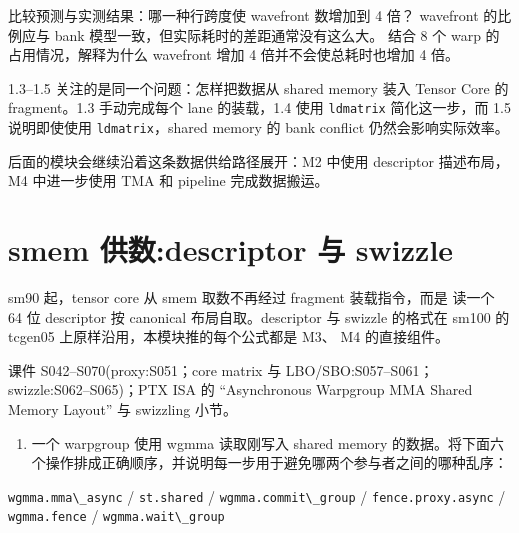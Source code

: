 \documentclass[11pt,a4paper,fontset=none]{ctexart}
\providecommand{\tightlist}{\setlength{\itemsep}{0pt}\setlength{\parskip}{0pt}}
\providecommand{\passthrough}[1]{#1}
\begin{document}
比较预测与实测结果：哪一种行跨度使 wavefront 数增加到 4 倍？ wavefront
的比例应与 bank 模型一致，但实际耗时的差距通常没有这么大。 结合 8 个
warp 的占用情况，解释为什么 wavefront 增加 4 倍并不会使总耗时也增加 4
倍。

\begin{lookback}

1.3--1.5 关注的是同一个问题：怎样把数据从 shared memory 装入 Tensor Core
的 fragment。1.3 手动完成每个 lane 的装载，1.4 使用
\passthrough{\lstinline!ldmatrix!} 简化这一步，而 1.5 说明即使使用
\passthrough{\lstinline!ldmatrix!}，shared memory 的 bank conflict
仍然会影响实际效率。

后面的模块会继续沿着这条数据供给路径展开：M2 中使用 descriptor
描述布局，M4 中进一步使用 TMA 和 pipeline 完成数据搬运。

\end{lookback}

\section{smem 供数:descriptor 与
swizzle}\label{smem-ux4f9bux6570descriptor-ux4e0e-swizzle}

sm90 起，tensor core 从 smem 取数不再经过 fragment 装载指令，而是 读一个
64 位 descriptor 按 canonical 布局自取。descriptor 与 swizzle 的格式在
sm100 的 tcgen05 上原样沿用，本模块推的每个公式都是 M3、 M4 的直接组件。

\begin{reading}

课件 S042--S070(proxy:S051；core matrix 与 LBO/SBO:S057--S061；
swizzle:S062--S065)；PTX ISA 的 ``Asynchronous Warpgroup MMA Shared
Memory Layout'' 与 swizzling 小节。

\end{reading}


\begin{enumerate}
\def\labelenumi{(\alph{enumi})}
\tightlist
\item
  一个 warpgroup 使用 wgmma 读取刚写入 shared memory
  的数据。将下面六个操作排成正确顺序，并说明每一步用于避免哪两个参与者之间的哪种乱序：
\end{enumerate}

\passthrough{\lstinline!wgmma.mma\_async!} /
\passthrough{\lstinline!st.shared!} /
\passthrough{\lstinline!wgmma.commit\_group!} /
\passthrough{\lstinline!fence.proxy.async!} /
\passthrough{\lstinline!wgmma.fence!} /
\passthrough{\lstinline!wgmma.wait\_group!}
\end{document}
